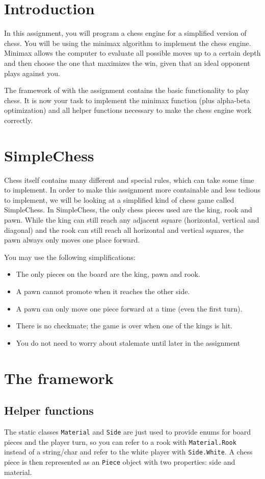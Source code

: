 \section*{Introduction}
In this assignment, you will program a chess engine for a simplified version of chess. You will be using the minimax algorithm to implement the chess engine. Minimax allows the computer to evaluate all possible moves up to a certain depth and then choose the one that maximizes the win, given that an ideal opponent plays against you.

The framework of with the assignment contains the basic functionality to play chess. It is now your task to implement the minimax function (plus alpha-beta optimization) and all helper functions necessary to make the chess engine work correctly. 


\section*{SimpleChess}
Chess itself contains many different and special rules, which can take some time to implement. In order to make this assignment more containable and less tedious to implement, we will be looking at a simplified kind of chess game called SimpleChess. In SimpleChess, the only chess pieces used are the king, rook and pawn. While the king can still reach any adjacent square (horizontal, vertical and diagonal) and the rook can still reach all horizontal and vertical squares, the pawn always only moves one place forward.

You may use the following simplifications:
\begin{itemize}
    \item The only pieces on the board are the king, pawn and rook.
    \item A pawn cannot promote when it reaches the other side.
    \item A pawn can only move one piece forward at a time (even the first turn).
    \item There is no checkmate; the game is over when one of the kings is hit.
    \item You do not need to worry about stalemate until later in the assignment
\end{itemize}

\section*{The framework}
\subsection*{Helper functions}
The static classes \texttt{Material} and \texttt{Side} are just used to provide enums for board pieces and the player turn, so you can refer to a rook with \texttt{Material.Rook} instead of a string/char and refer to the white player with \texttt{Side.White}. A chess piece is then represented as an \texttt{Piece} object with two properties: side and material.

